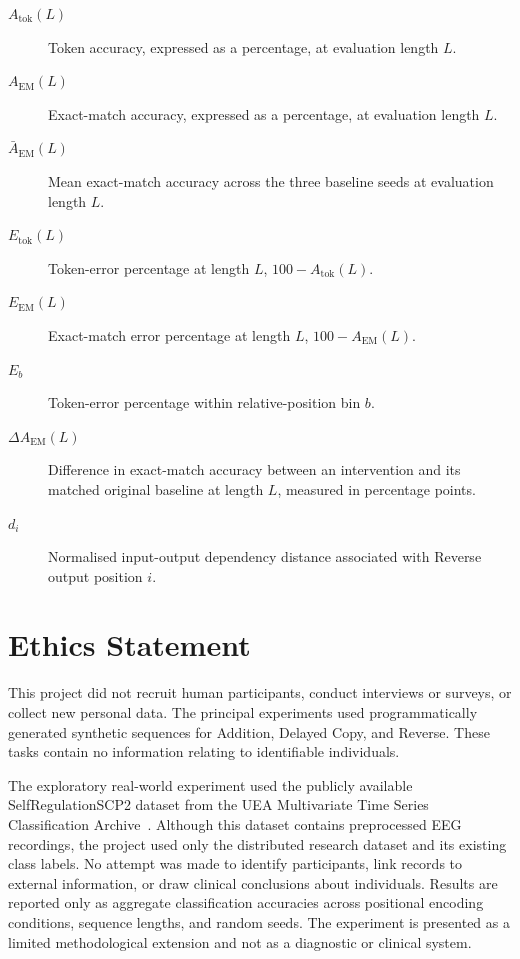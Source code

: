 \documentclass[
    author={Aanchala Ravindra Bhongade},
    supervisor={Dr. Fernando Moreno-Pino},
    degree={MSc},
    title={Length Generalisation in Transformer-Based Sequence Models: Failure Taxonomy and Mitigation Strategies},
    subtitle={},
    type={},
    year={2026}
]{dissertation}
\begin{document}
\begin{description}
    \item[$A_{\mathrm{tok}}(L)$]
    Token accuracy, expressed as a percentage, at evaluation length $L$.

    \item[$A_{\mathrm{EM}}(L)$]
    Exact-match accuracy, expressed as a percentage, at evaluation length $L$.

    \item[$\bar{A}_{\mathrm{EM}}(L)$]
    Mean exact-match accuracy across the three baseline seeds at evaluation length $L$.

    \item[$E_{\mathrm{tok}}(L)$]
    Token-error percentage at length $L$,
    $100-A_{\mathrm{tok}}(L)$.

    \item[$E_{\mathrm{EM}}(L)$]
    Exact-match error percentage at length $L$,
    $100-A_{\mathrm{EM}}(L)$.

    \item[$E_b$]
    Token-error percentage within relative-position bin $b$.

    \item[$\Delta A_{\mathrm{EM}}(L)$]
    Difference in exact-match accuracy between an intervention and its matched original baseline at length $L$, measured in percentage points.

    \item[$d_i$]
    Normalised input-output dependency distance associated with Reverse output position $i$.

\end{description}

\chapter*{Ethics Statement}

\noindent
This project did not recruit human participants, conduct interviews or surveys, or collect new personal data. The principal experiments used programmatically generated synthetic sequences for Addition, Delayed Copy, and Reverse. These tasks contain no information relating to identifiable individuals.

The exploratory real-world experiment used the publicly available
SelfRegulationSCP2 dataset from the UEA Multivariate Time Series
Classification Archive~\cite{bagnall2018uea}. Although this dataset contains preprocessed EEG recordings, the project used only the distributed research dataset and its existing class labels. No attempt was made to identify participants, link records to external information, or draw clinical conclusions about individuals. Results are reported only as aggregate classification accuracies across positional encoding conditions, sequence lengths, and random seeds. The experiment is presented as a limited methodological extension and not as a diagnostic or clinical system.
\end{document}
